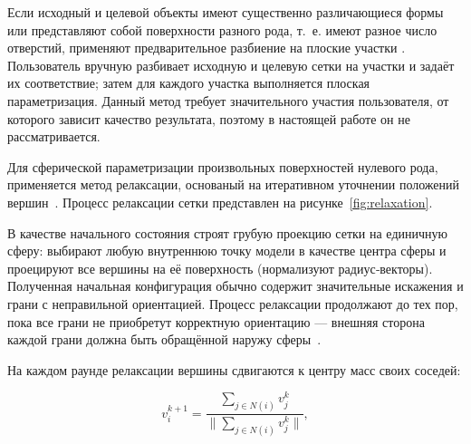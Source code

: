 Если исходный и целевой объекты имеют существенно различающиеся формы или представляют собой поверхности разного рода, т.~е. имеют разное число отверстий, применяют предварительное разбиение на плоские участки \cite{mocanu}. Пользователь вручную разбивает исходную и целевую сетки на участки и задаёт их соответствие; затем для каждого участка выполняется плоская параметризация. Данный метод требует значительного участия пользователя, от которого зависит качество результата, поэтому в настоящей работе он не рассматривается.



Для сферической параметризации произвольных поверхностей нулевого рода, применяется метод релаксации, основаный на итеративном уточнении положений вершин~\cite{alexa}. Процесс релаксации сетки представлен на рисунке~\ref{fig:relaxation}.

В качестве начального состояния строят грубую проекцию сетки на единичную сферу: выбирают любую внутреннюю точку модели в качестве центра сферы и проецируют все вершины на её поверхность (нормализуют радиус‑векторы). Полученная начальная конфигурация обычно содержит значительные искажения и грани с неправильной ориентацией. Процесс релаксации продолжают до тех пор, пока все грани не приобретут корректную ориентацию — внешняя сторона каждой грани должна быть обращённой наружу сферы~\cite{alexa}.

На каждом раунде релаксации вершины сдвигаются к центру масс своих соседей:

\begin{equation}
    v_i^{k + 1} = \frac{\sum_{j \in N(i)} v_j^{k}}{\parallel \sum_{j \in N(i)} v_j^{k} \parallel},
\end{equation}


